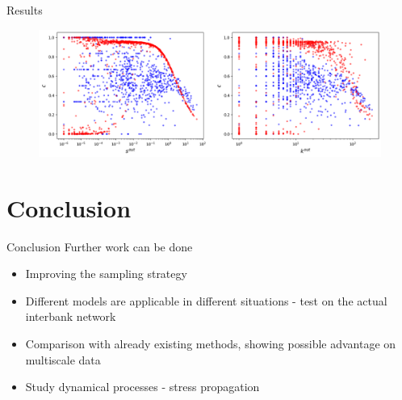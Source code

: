\documentclass{beamer}
\begin{document}
\begin{frame}{Results}
\begin{figure}[!ht]
    \centering
    \includegraphics[scale=0.3]{img/Degree_corrected/cl_coeff.png}
\end{figure}
\end{frame}

\section*{Conclusion}
\begin{frame}{Conclusion}
Further work can be done 
\begin{itemize}
    \item Improving the sampling strategy
    \item Different models are applicable in different situations - test on the actual interbank network
    \item Comparison with already existing methods, showing possible advantage on multiscale data
    \item Study dynamical processes - stress propagation
\end{itemize}
\end{frame}

\printbibliography
\end{document}
